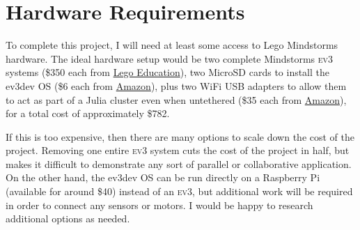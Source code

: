\documentclass[]{article}
\newcommand{\ev}{\textsc{ev3}}
\begin{document}
\section{Hardware Requirements}
To complete this project, I will need at least some access to Lego Mindstorms hardware. The ideal hardware setup would be two complete Mindstorms \ev{} systems (\$350 each from \href{https://shop.education.lego.com/legoed/en-US/catalog/product.jsp?productId=5003400&isSimpleSearch=false&ProductLine=LEGO-MINDSTORMS-Education-EV3}{Lego Education}), two MicroSD cards to install the ev3dev OS (\$6 each from \href{http://www.amazon.com/Kingston-microSDHC-Memory-SDC4-8GBET/dp/B00200K1TS/ref=sr_1_12?s=pc&ie=UTF8&qid=1445443786&sr=1-12&keywords=micro+sd+card}{Amazon}), plus two WiFi USB adapters to allow them to act as part of a Julia cluster even when untethered (\$35 each from \href{http://www.amazon.com/NETGEAR-N150-Wi-Fi-Adapter-WNA1100/dp/B0036R9XRU/ref=sr_1_1?ie=UTF8&qid=1445440992&sr=8-1&keywords=netgear+n150+wna1100}{Amazon}), for a total cost of approximately \$782. 

If this is too expensive, then there are many options to scale down the cost of the project. Removing one entire \ev{} system cuts the cost of the project in half, but makes it difficult to demonstrate any sort of parallel or collaborative application. On the other hand, the ev3dev OS can be run directly on a Raspberry Pi (available for around \$40) instead of an \ev{}, but additional work will be required in order to connect any sensors or motors. I would be happy to research additional options as needed. 
\end{document}
